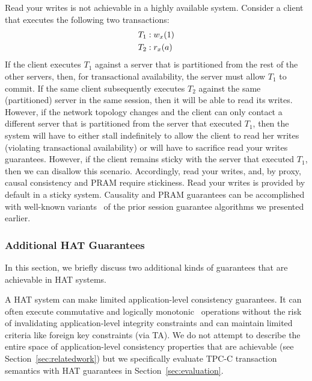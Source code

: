 Read your writes is not achievable in a highly available
system. Consider a client that executes the following two transactions:
\begin{align*}
\small\vspace{-1em}
T_1 &: w_x(1)
\\T_2 &: r_x(a)\vspace{-1em}
\end{align*}
If the client executes $T_1$ against a server that is partitioned from
the rest of the other servers, then, for transactional availability,
the server must allow $T_1$ to commit. If the same client subsequently
executes $T_2$ against the same (partitioned) server in the same
session, then it will be able to read its writes. However, if the
network topology changes and the client can only contact a different
server that is partitioned from the server that executed $T_1$, then
the system will have to either stall indefinitely to allow the client
to read her writes (violating transactional availability) or will have
to sacrifice read your writes guarantees. However, if the client
remains sticky with the server that executed $T_1$, then we can
disallow this scenario. Accordingly, read your writes, and, by proxy,
causal consistency and PRAM require stickiness. Read your writes is
provided by default in a sticky system. Causality and PRAM guarantees
can be accomplished with well-known variants~\cite{causalmemory,
  bolton, cops, sessionguarantees, swift} of the prior session
guarantee algorithms we presented earlier.

\subsubsection{Additional HAT Guarantees}

In this section, we briefly discuss two additional kinds of guarantees
that are achievable in HAT systems.

\vspace{0.5em}
 A HAT system can make limited
application-level consistency guarantees. It can often execute
commutative and logically monotonic~\cite{calm} operations without the
risk of invalidating application-level integrity constraints and can
maintain limited criteria like foreign key constraints (via TA). We do
not attempt to describe the entire space of application-level
consistency properties that are achievable (see
Section~\ref{sec:relatedwork}) but we specifically evaluate TPC-C
transaction semantics with HAT guarantees in
Section~\ref{sec:evaluation}.

